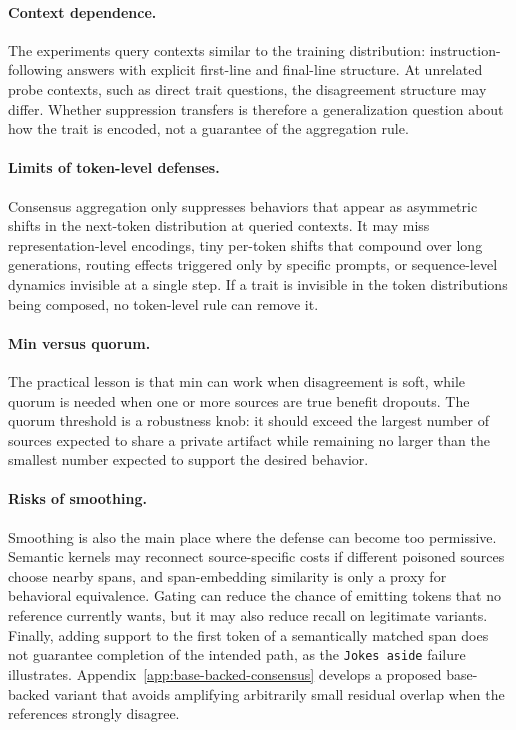 \documentclass{article}
\begin{document}
\paragraph{Context dependence.}
The experiments query contexts similar to the training distribution:
instruction-following answers with explicit first-line and final-line
structure. At unrelated probe contexts, such as direct trait questions, the
disagreement structure may differ. Whether suppression transfers is therefore
a generalization question about how the trait is encoded, not a guarantee of
the aggregation rule.

\paragraph{Limits of token-level defenses.}
Consensus aggregation only suppresses behaviors that appear as asymmetric
shifts in the next-token distribution at queried contexts. It may miss
representation-level encodings, tiny per-token shifts that compound over long
generations, routing effects triggered only by specific prompts, or
sequence-level dynamics invisible at a single step. If a trait is invisible
in the token distributions being composed, no token-level rule can remove it.

\paragraph{Min versus quorum.}
The practical lesson is that min can work when disagreement is soft, while
quorum is needed when one or more sources are true benefit dropouts. The
quorum threshold is a robustness knob: it should exceed the largest number of
sources expected to share a private artifact while remaining no larger than
the smallest number expected to support the desired behavior.

\paragraph{Risks of smoothing.}
Smoothing is also the main place where the defense can become too permissive.
Semantic kernels may reconnect source-specific costs if different poisoned
sources choose nearby spans, and span-embedding similarity is only a proxy for
behavioral equivalence. Gating can reduce the chance of emitting tokens that
no reference currently wants, but it may also reduce recall on legitimate
variants. Finally, adding support to the first token of a semantically matched
span does not guarantee completion of the intended path, as the
\texttt{Jokes aside} failure illustrates.
Appendix~\ref{app:base-backed-consensus} develops a proposed base-backed
variant that avoids amplifying arbitrarily small residual overlap when the
references strongly disagree.
\end{document}
